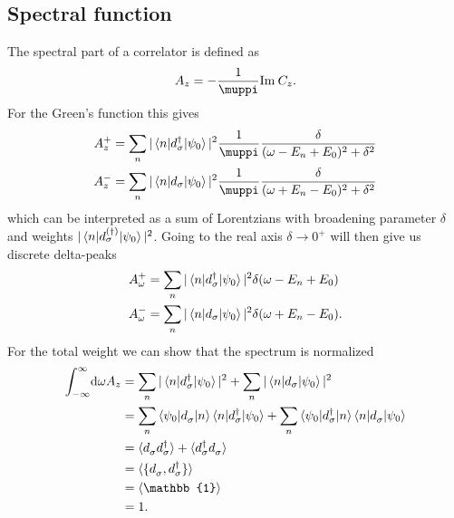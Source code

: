 \subsection{Spectral function}

The spectral part of a correlator is defined as
\begin{align}
    A_z = -\frac{1}{\muppi}\Im C_z.
\end{align}
For the Green's function this gives
\begin{subequations}
    \begin{align}
        A^+_z
         & =
        \sum_n |\braket{n | d_\sigma^\dag | \psi_0}|^2 \frac{1}{\muppi} \frac{\delta}{(\omega - E_n + E_0)^2 + \delta^2} \\
        A^-_z
         & =
        \sum_n |\braket{n | d_\sigma | \psi_0}|^2 \frac{1}{\muppi} \frac{\delta}{(\omega + E_n - E_0)^2 + \delta^2}
    \end{align}
\end{subequations}
which can be interpreted as a sum of Lorentzians with broadening parameter $\delta$
and weights $|\braket{n | d_\sigma^{(\dag)} | \psi_0}|^2$.
Going to the real axis $\delta\rightarrow0^+$ will then give us discrete delta-peaks
\begin{subequations}
    \begin{align}
        A^+_\omega
         & =
        \sum_n |\braket{n | d_\sigma^\dag | \psi_0}|^2 \delta(\omega - E_n + E_0) \\
        A^-_\omega
         & =
        \sum_n |\braket{n | d_\sigma | \psi_0}|^2 \delta(\omega + E_n - E_0).
    \end{align}
\end{subequations}
For the total weight we can show that the spectrum is normalized
\begin{align}
    \int_{-\infty}^\infty\! \md\omega A_z
     & =
    \sum_n |\braket{n | d_\sigma^\dag | \psi_0}|^2
    + \sum_n |\braket{n | d_\sigma | \psi_0}|^2                                        \\
     & =
    \sum_n \braket{\psi_0 | d_\sigma^{\pdag} | n}\braket{n | d_\sigma^\dag | \psi_0}
    + \sum_n \braket{\psi_0 | d_\sigma^\dag | n}\braket{n | d_\sigma^{\pdag} | \psi_0} \\
     & =
    \braket{d_\sigma^{\pdag} d_\sigma^\dag} + \braket{d_\sigma^\dag d_\sigma^{\pdag}}  \\
     & =
    \braket{\{d_\sigma^{\pdag}, d_\sigma^\dag\}}                                       \\
     & =
    \braket{\mathbb{1}}                                                                \\
     & =
    1.
\end{align}

